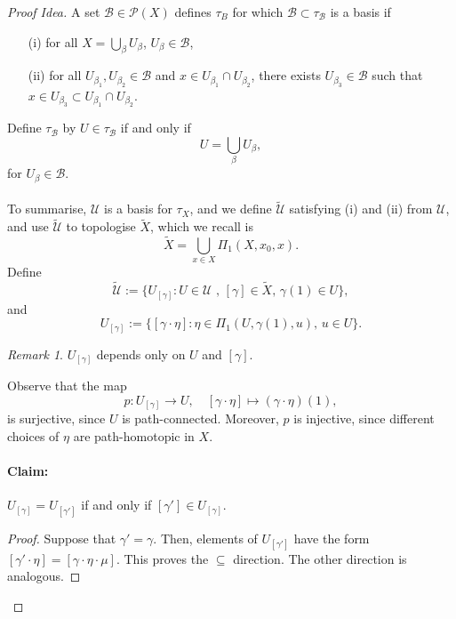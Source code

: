 \documentclass[a4paper]{report}
\theoremstyle{definition}
\theoremstyle{remark}
\newtheorem{remark}{Remark}
\theoremstyle{proposition}
\theoremstyle{conjecture}
\theoremstyle{lemma}
\theoremstyle{corollary}
\theoremstyle{exercise}
\newcommand{\mcal}{\mathcal}
\begin{document}
\begin{proof}[Proof Idea]
    A set $\mcal{B} \in \mcal{P}(X)$ defines $\tau_B$ for which $\mcal{B} \subset \tau_\mcal{B}$
    is a basis if \begin{itemize}
        \item[(i)] for all $X = \bigcup_\beta U_\beta$, $U_\beta \in \mcal{B}$,
        \item[(ii)] for all $U_{\beta_1}, U_{\beta_2} \in \mcal{B}$ and $x \in U_{\beta_1} \cap U_{\beta_2}$,
        there exists $U_{\beta_3} \in \mcal{B}$ such that $x \in U_{\beta_3} \subset U_{\beta_1}\cap U_{\beta_2}$.
    \end{itemize}
    Define $\tau_\mcal{B}$ by $U \in \tau_\mcal{B}$ if and only if 
    $$U = \bigcup_\beta U_\beta,$$
    for $U_\beta \in \mcal{B}$.\\\\ 
    To summarise, $\mcal{U}$ is a basis for $\tau_X$, and we define $\widetilde{\mcal{U}}$ satisfying 
    (i) and (ii) from $\mcal{U}$, and use $\widetilde{\mcal{U}}$ to topologise $\widetilde{X}$, 
    which we recall is 
    $$\widetilde{X} =  \bigcup_{x \in X} \Pi_1(X,x_0,x).$$
    Define 
    $$\widetilde{\mcal{U}} := \lbrace U_{[\gamma]} : \text{$U \in \mcal{U}$ , $[\gamma] \in \widetilde{X}$, $\gamma(1) \in U$}\rbrace,$$
    and $$U_{[\gamma]} := \lbrace [\gamma \cdot \eta] : \text{$\eta \in \Pi_1(U,\gamma(1),u)$, $u \in U$}\rbrace.$$
    \begin{remark}
        $U_{[\gamma]}$ depends only on $U$ and $[\gamma]$.
    \end{remark}
    Observe that the map 
    $$p : U_{[\gamma]} \longrightarrow U,\quad [\gamma\cdot \eta] \longmapsto (\gamma \cdot \eta)(1),$$
    is surjective, since $U$ is path-connected. Moreover, $p$ is injective, since different 
    choices of $\eta$ are path-homotopic in $X$.
    \paragraph{Claim:} $U_{[\gamma]} = U_{[\gamma']}$ if and only if $[\gamma'] \in U_{[\gamma]}$.
    \begin{proof}
        Suppose that $\gamma' = \gamma$. Then, elements of $U_{[\gamma']}$ 
        have the form 
        $[\gamma' \cdot \eta] = [\gamma \cdot \eta \cdot \mu]$. This proves the $\subseteq$ 
        direction. The other direction is analogous.
    \end{proof}

\end{proof}
\end{document}
